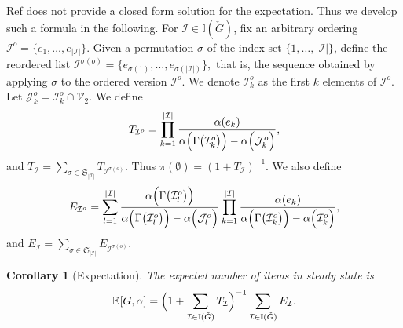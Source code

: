 \documentclass{llncs}
\newtheorem{cor}[theo]{Corollary}
\begin{document}
 Ref \cite{BMMR20} does not provide a closed form solution for the expectation. Thus
 we develop such a formula in the following. 
For $\mathcal{I}\in\mathbb{I}(\check G)$,  fix an arbitrary ordering 
$\mathcal{I}^o=\{e_1,\dots,e_{|\mathcal{I}|}\}$. Given a permutation $\sigma$ 
of the index set $\{1,\dots,|\mathcal{I}|\}$, define the reordered 
list $\mathcal{I}^{\sigma(o)}=\{e_{\sigma(1)},\dots,e_{\sigma(|\mathcal{I}|)}\},$
that is, the sequence obtained by applying 
$\sigma$ to the ordered version $\mathcal{I}^o$. 
 We denote $\mathcal{I}_k^o$ as the first $k$ elements of $\mathcal{I}^o$.
Let $\mathcal{J}_k^o=\mathcal{I}_k^o\cap \mathcal{V}_2$. 
We define 
$$
T_{\mathcal{I}^o}=\prod_{k=1}^{|\mathcal{I}|}\frac{\alpha(e_{k})}{\alpha\Bigl(\Gamma\bigl(\mathcal{I}_k^o\bigr)\Bigr)-\alpha\Bigl(\mathcal{J}_k^o\Bigr)},
$$
and $T_{\mathcal{I}}=\sum_{\sigma \in \mathfrak{S}_{|\mathcal{I}|}} T_{\mathcal{I}^{\sigma(o)}}$. Thus $\pi(\emptyset) = (1 +T_{\mathcal{I}})^{-1}$. 
We also define
$$E_{\mathcal{I}^o}=\sum_{l=1}^{|\mathcal{I}|}
\frac{\alpha\Bigl(\Gamma\bigl(\mathcal{I}_l^o\bigr)\Bigr)}
{\alpha\Bigl(\Gamma\bigl(\mathcal{I}_l^o\bigr)\Bigr)-
\alpha\Bigl(\mathcal{J}_l^o\Bigr)}\prod_{k=1}^{|\mathcal{I}|}\frac{\alpha(e_{k})}{\alpha\Bigl(\Gamma\bigl(\mathcal{I}_k^o\bigr)\Bigr)-
\alpha\Bigl(\mathcal{I}_k^o\Bigr)},$$
and $E_{\mathcal{I}}=\sum_{\sigma \in \mathfrak{S}_{|\mathcal{I}|}} E_{\mathcal{I}^{\sigma(o)}}$.

\begin{cor}[Expectation]\label{cor:exp-multi}
The expected number of items in steady state is
\begin{equation}\label{eq:exp-multi}
\mathbb{E}[G,\alpha]=\Bigl(1+\sum_{\mathcal{I}\in\mathbb{I}(\check G)}T_\mathcal{I}\Bigr)^{-1}\sum_{\mathcal{I}\in\mathbb{I}(\check G)}E_\mathcal{I}.
\end{equation}
\end{cor} 
\end{document}
